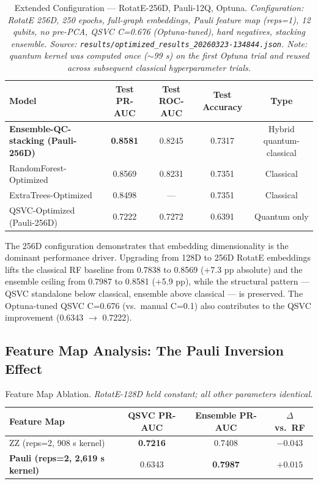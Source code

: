 \documentclass[twocolumn,10pt]{article}
\begin{document}
\begin{table}[t]
\centering
\caption{Extended Configuration --- RotatE-256D, Pauli-12Q, Optuna. \textit{Configuration: RotatE 256D, 250 epochs, full-graph embeddings, Pauli feature map (reps=1), 12 qubits, no pre-PCA, QSVC C=0.676 (Optuna-tuned), hard negatives, stacking ensemble. Source: \texttt{results/optimized\_results\_20260323-134844.json}. Note: quantum kernel was computed once (${\sim}$99 s) on the first Optuna trial and reused across subsequent classical hyperparameter trials.}}
\label{tab:extended}
\begin{tabular}{@{}lcccc@{}}
\toprule
\textbf{Model} & \textbf{Test PR-AUC} & \textbf{Test ROC-AUC} & \textbf{Test Accuracy} & \textbf{Type} \\
\midrule
\textbf{Ensemble-QC-stacking (Pauli-256D)} & \textbf{0.8581} & 0.8245 & 0.7317 & Hybrid quantum-classical \\
RandomForest-Optimized & 0.8569 & 0.8231 & 0.7351 & Classical \\
ExtraTrees-Optimized & 0.8498 & --- & 0.7351 & Classical \\
QSVC-Optimized (Pauli-256D) & 0.7222 & 0.7272 & 0.6391 & Quantum only \\
\bottomrule
\end{tabular}
\end{table}

The 256D configuration demonstrates that embedding dimensionality is the dominant performance driver. Upgrading from 128D to 256D RotatE embeddings lifts the classical RF baseline from 0.7838 to 0.8569 (+7.3 pp absolute) and the ensemble ceiling from 0.7987 to 0.8581 (+5.9 pp), while the structural pattern --- QSVC standalone below classical, ensemble above classical --- is preserved. The Optuna-tuned QSVC C=0.676 (vs.\ manual C=0.1) also contributes to the QSVC improvement (0.6343 $\to$ 0.7222).

\subsection{Feature Map Analysis: The Pauli Inversion Effect}
\label{sec:results_feature_map}

\begin{table}[t]
\centering
\caption{Feature Map Ablation. \textit{RotatE-128D held constant; all other parameters identical.}}
\label{tab:ablation}
\begin{tabular}{@{}lccc@{}}
\toprule
\textbf{Feature Map} & \textbf{QSVC PR-AUC} & \textbf{Ensemble PR-AUC} & \textbf{$\Delta$ vs.\ RF} \\
\midrule
ZZ (reps=2, 908 s kernel) & \textbf{0.7216} & 0.7408 & $-0.043$ \\
\textbf{Pauli (reps=2, 2,619 s kernel)} & 0.6343 & \textbf{0.7987} & $+0.015$ \\
\bottomrule
\end{tabular}
\end{table}
\end{document}
